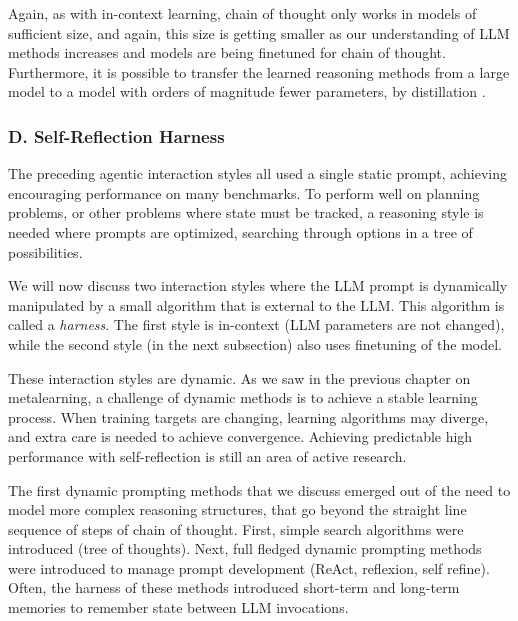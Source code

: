 Again, as with in-context learning, chain of thought only works in models of sufficient size, and
again, this size is getting smaller as our understanding of LLM methods
increases and models are being finetuned for chain of thought. Furthermore, it is possible to  transfer 
the learned reasoning methods from a large model to a model with
orders of magnitude fewer parameters, by distillation \citep{li-etal-2023-symbolic}.  




\subsubsection{D. Self-Reflection Harness}
The preceding agentic interaction styles all used a single static
prompt, achieving encouraging performance on many
benchmarks. To perform well on planning problems, or other problems where state must be tracked,  a reasoning
style is needed where prompts are optimized,  searching through options in a tree
of possibilities. %

We will now discuss two interaction styles where the LLM prompt is
dynamically manipulated by a small algorithm that is external to the LLM. This algorithm is called a {\em harness}. The first style is in-context  (LLM parameters are not changed), while the second style (in the next subsection) also uses
finetuning of the model.

These interaction styles are  dynamic. 
As we saw in the previous chapter on metalearning, a challenge of dynamic methods is to achieve a stable learning process.
When training targets are changing,  learning algorithms may diverge, and extra care is needed to achieve convergence.
Achieving predictable high performance with self-reflection is still an area of active research.

The first dynamic prompting methods that we discuss 
emerged out of
the need to model more complex reasoning structures, that go beyond
the straight line sequence of steps of chain of thought. First, simple search algorithms were introduced (tree of thoughts). Next, full fledged dynamic prompting  methods were introduced to manage prompt development (ReAct, reflexion, self refine). Often, the harness of these methods introduced short-term and long-term memories to remember state between LLM invocations.

